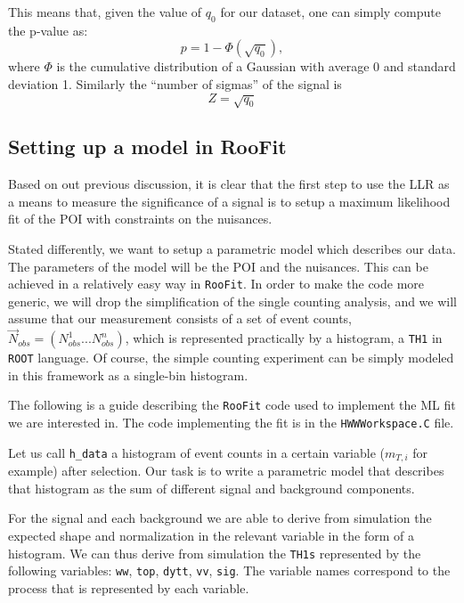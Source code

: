 \documentclass[a4paper,12pt]{article}
\begin{document}
This means that, given the value of $q_0$ for our dataset, one can simply
compute the p-value as:
\begin{equation}
p=1-\Phi(\sqrt{q_0}),
\end{equation}
where $\Phi$ is the cumulative distribution of a Gaussian with average 0 and
standard deviation 1. Similarly the ``number of sigmas'' of the signal is 
\begin{equation}
Z=\sqrt{q_0}
\end{equation}

\subsection{Setting up a model in RooFit}
Based on out previous discussion, it is clear that the first step to use the
LLR as a means to measure the significance of a signal is to setup a maximum
likelihood fit of the POI with constraints on the nuisances.

Stated differently, we want to setup a parametric model which describes our
data. The parameters of the model will be the POI and the nuisances. This can
be achieved in a relatively easy way in \verb+RooFit+. In order to make the
code more generic, we will drop the simplification of the single counting
analysis, and we will assume that our measurement consists of a set of event counts,
$\vec{N}_{obs}=(N_{obs}^1...N_{obs}^n)$, which is represented practically by a
histogram, a \verb+TH1+ in \verb+ROOT+ language. Of course, the simple
counting experiment can be simply modeled in this framework as a single-bin
histogram.

The following is a guide describing the \verb+RooFit+ code used to implement the ML
fit we are interested in. The code implementing the fit is in the
\verb+HWWWorkspace.C+ file.

Let us call \verb+h_data+ a histogram of event counts in a certain variable
($m_{T,i}$ for example) after selection. Our task is to write a parametric
model that describes that histogram as the sum of different signal and
background components. 

For the signal and each background we are able to derive from simulation the
expected shape and normalization in the relevant variable in the form of a
histogram. We can thus derive
from simulation the \verb+TH1s+ represented by the following variables:
\verb+ww+, \verb+top+, \verb+dytt+, \verb+vv+, \verb+sig+. The variable names
correspond to the process that is represented by each variable.
\end{document}
